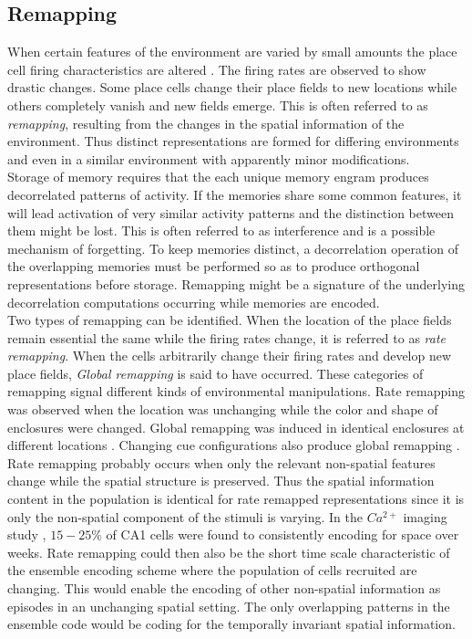 \subsection{Remapping}
\label{remapping}
When certain features of the environment are varied by small amounts the place cell firing characteristics are altered \cite{Kubie1987}. The firing rates are observed to show drastic changes. Some place cells change their place fields to new locations while others completely vanish and new fields emerge. This is often referred to as \emph{remapping}, resulting from the changes in the spatial information of the environment. Thus distinct representations are formed for differing environments and even in a similar environment with apparently minor modifications. \\
Storage of memory requires that the each unique memory engram produces decorrelated patterns of activity. If the memories share some common features, it will lead activation of very similar activity patterns and the distinction between them might be lost. This is often referred to as interference and is a possible mechanism of forgetting. To keep memories distinct, a decorrelation operation of the overlapping memories must be performed so as to produce orthogonal representations before storage. Remapping might be a signature of the underlying decorrelation computations occurring while memories are encoded.\\
Two types of remapping can be identified. When the location of the place fields remain essential the same while the firing rates change, it is referred to as \emph{rate remapping}. When the cells arbitrarily change their firing rates and develop new place fields, \emph{Global remapping} is said to have occurred. These categories of remapping signal different kinds of environmental manipulations. Rate remapping was observed when the location was unchanging while the color and shape of enclosures were changed. Global remapping was induced in identical enclosures at different locations \cite{Leutgeb2005a}. Changing cue configurations also produce global remapping \cite{Leutgeb2005a}.
Rate remapping probably occurs when only the relevant non-spatial features change while the spatial structure is preserved. Thus the spatial information content in the population is identical for rate remapped representations since it is only the non-spatial component of the stimuli is varying. In the $Ca^{2+}$ imaging study \cite{Ziv2013}, $15-25 \% $ of CA1 cells were found to consistently encoding for space over weeks. Rate remapping could then also be the short time scale characteristic of the ensemble encoding scheme where the population of cells recruited are changing. This would enable the encoding of other non-spatial information as episodes in an unchanging spatial setting. The only overlapping patterns in the ensemble code would be coding for the temporally invariant spatial information. \\
